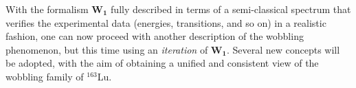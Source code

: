 With the formalism $\mathbf{W_1}$ fully described in terms of a semi-classical spectrum that verifies the experimental data (energies, transitions, and so on) in a realistic fashion, one can now proceed with another description of the wobbling phenomenon, but this time using an \emph{iteration} of $\mathbf{W_1}$. Several new concepts will be adopted, with the aim of obtaining a unified and consistent view of the wobbling family of $^{163}$Lu.